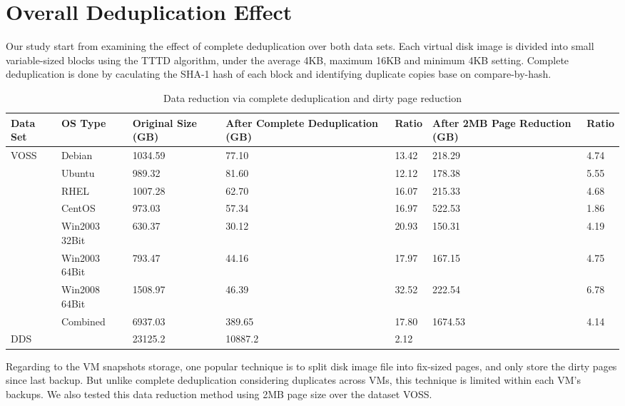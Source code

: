 \section{Overall Deduplication Effect}
Our study start from examining the effect of complete deduplication over both data sets.
Each virtual disk image is divided into small variable-sized blocks using the TTTD algorithm\cite{frame05},
under the average 4KB, maximum 16KB and minimum 4KB setting. Complete deduplication is
done by caculating the SHA-1 hash of each block and identifying duplicate copies base on compare-by-hash.

\begin{table*}[htb]
  \centering
    \begin{tabular}{|l|l|p{0.8in}|p{1.1in}|p{0.3in}|p{0.9in}|p{0.3in}|}
        \hline
        Data Set & OS Type & Original Size \newline (GB) & After Complete \newline Deduplication (GB) & Ratio & After 2MB Page \newline Reduction (GB) & Ratio \\ \hline
        \multirow{8}{*}{VOSS} & Debian & 1034.59 & 77.10 & 13.42 & 218.29 & 4.74 \\ \cline{2-7}
         & Ubuntu & 989.32 & 81.60 & 12.12 & 178.38 & 5.55 \\ \cline{2-7}
         & RHEL & 1007.28 & 62.70 & 16.07 & 215.33 & 4.68 \\ \cline{2-7}
         & CentOS & 973.03 & 57.34 & 16.97 & 522.53 & 1.86 \\ \cline{2-7}
         & Win2003 32Bit & 630.37 & 30.12 & 20.93 & 150.31 & 4.19 \\ \cline{2-7}
         & Win2003 64Bit & 793.47 & 44.16 & 17.97 & 167.15 & 4.75 \\ \cline{2-7}
         & Win2008 64Bit & 1508.97 & 46.39 & 32.52 & 222.54 & 6.78 \\ \cline{2-7}
         & Combined & 6937.03 & 389.65 & 17.80 & 1674.53 & 4.14 \\ \hline
        DDS & ~ & 23125.2 & 10887.2 & 2.12 & ~ & ~ \\
        \hline
    \end{tabular}
    \caption{Data reduction via complete deduplication and dirty page reduction}
    \label{tab:dedup}
\end{table*}

Regarding to the VM snapshots storage, one popular technique is to split disk image file into fix-sized
pages, and only store the dirty pages since last backup. But unlike complete deduplication considering duplicates
across VMs, this technique is limited within each VM's backups. We also tested this data reduction method
using 2MB page size over the dataset VOSS. 

